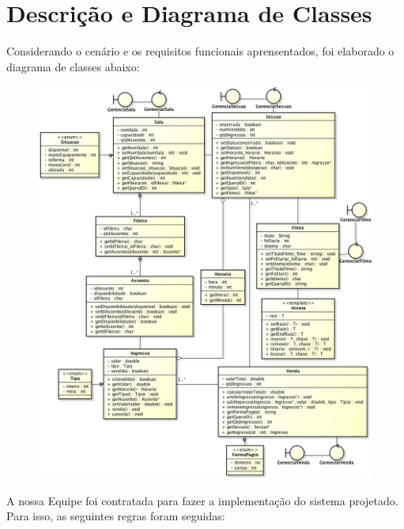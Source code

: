 \documentclass[a4paper]{article}
\begin{document}
\pagebreak

\section{Descrição e Diagrama de Classes}
\hspace{5 mm} Considerando o cenário e os requisitos funcionais aprensentados, foi elaborado o diagrama de classes abaixo:\\

\begin{figure}[ht!]
\centering
\advance\leftskip-1.7cm
\includegraphics[width=150mm]{diagrama.png}
\end{figure}


A nossa Equipe foi contratada para fazer a implementação do sistema projetado. Para isso, as seguintes regras foram seguidas:
\end{document}
